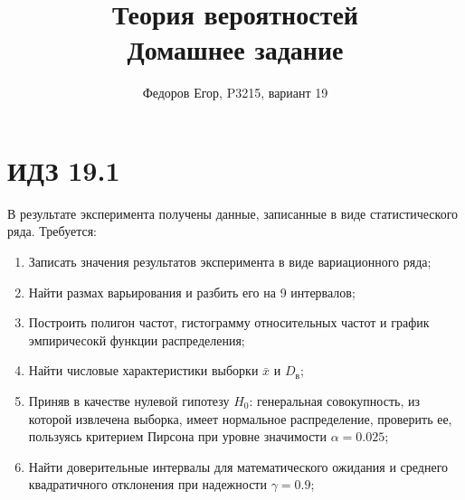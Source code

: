 \documentclass{article}
\title{\textbf{Теория вероятностей} \\ Домашнее задание \textnumero 2}
\author{Федоров Егор, P3215, вариант 19}
\date{}
\theoremstyle{problemstyle}
\begin{document}
\maketitle
\section{ИДЗ 19.1}
В результате эксперимента получены данные, записанные в виде статистического ряда.
Требуется:
\begin{enumerate}
  \item Записать значения результатов эксперимента в виде вариационного ряда;
  \item Найти размах варьирования и разбить его на 9 интервалов;
  \item Построить полигон частот, гистограмму относительных частот и график 
    эмпиричесокй функции распределения;
  \item Найти числовые характеристики выборки \(\bar x\) и \(D_\text{в}\);
  \item Приняв в качестве нулевой гипотезу \(H_0\): генеральная совокупность,
    из которой извлечена выборка, имеет нормальное распределение, проверить ее,
    пользуясь критерием Пирсона при уровне значимости \(\alpha = 0.025\);
  \item Найти доверительные интервалы для математического ожидания и среднего
    квадратичного отклонения при надежности \(\gamma = 0.9\);
\end{enumerate}
\end{document}
